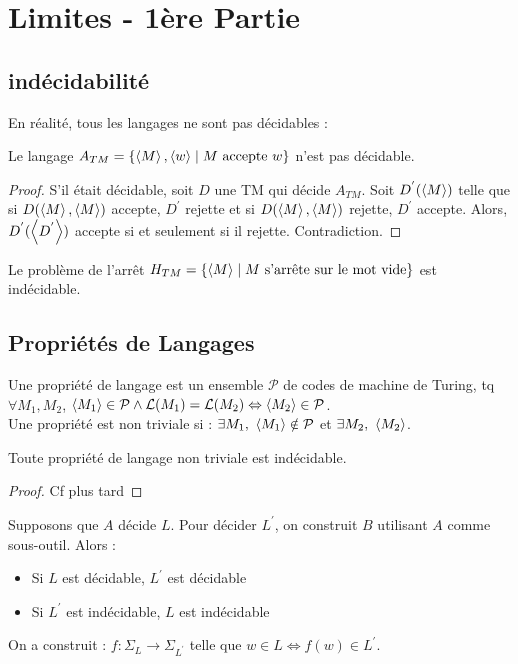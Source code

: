 \documentclass{cours}
\begin{document}
\section{Limites - 1ère Partie}
\subsection{indécidabilité}
En réalité, tous les langages ne sont pas décidables : 
\begin{proposition}
    Le langage $A_{TM} = \left\{\left\langle M \right\rangle, \left\langle w \right\rangle \mid M \text{ accepte } w\right\}$ n'est pas décidable.
\end{proposition}

\begin{proof}
    S'il était décidable, soit $D$ une TM qui décide $A_{TM}$. Soit $D^{'}(\left\langle M \right\rangle)$ telle que si $D(\left\langle M \right\rangle, \left\langle M \right\rangle)$ accepte, $D^{'}$ rejette et si $D(\left\langle M \right\rangle,\left\langle M \right\rangle)$ rejette, $D^{'}$ accepte. Alors, $D^{'}(\left\langle D^{'} \right\rangle)$ accepte si et seulement si il rejette. Contradiction.
\end{proof}

\begin{proposition}
    Le problème de l'arrêt $H_{TM} = \left\{\left\langle M \right\rangle\mid M \text{ s'arrête sur le mot vide}\right\}$ est indécidable. 
\end{proposition}

\subsection{Propriétés de Langages}
\begin{definition}
    Une propriété de langage est un ensemble $\mathcal{P}$ de codes de machine de Turing, tq $\forall M_{1}, M_{2}$, $\left\langle M_{1} \right\rangle \in \mathcal{P} \wedge \mathcal{L}(M_{1}) = \mathcal{L}(M_{2}) \Leftrightarrow \left\langle M_{2} \right\rangle \in \mathcal{P}$. \\
    Une propriété est non triviale si : $\exists M_{1}, \ \left\langle M_{1} \right\rangle \notin \mathcal{P}$ et $\exists M_{2}, \ \left\langle M_{2} \right\rangle$.
\end{definition}

\begin{theorem}[Rice]
    Toute propriété de langage non triviale est indécidable.
\end{theorem}

\begin{proof}
    Cf plus tard    
\end{proof}

\begin{proposition}
    Supposons que $A$ décide $L$. Pour décider $L^{'}$, on construit $B$ utilisant $A$ comme sous-outil. Alors :
    \begin{itemize}
        \item Si $L$ est décidable, $L^{'}$ est décidable
        \item Si $L^{'}$ est indécidable, $L$ est indécidable
    \end{itemize}
    On a construit : $f : \Sigma_{L} \rightarrow \Sigma_{L^{'}}$ telle que $w\in L \Leftrightarrow f(w) \in L^{'}$.
\end{proposition}
\end{document}
